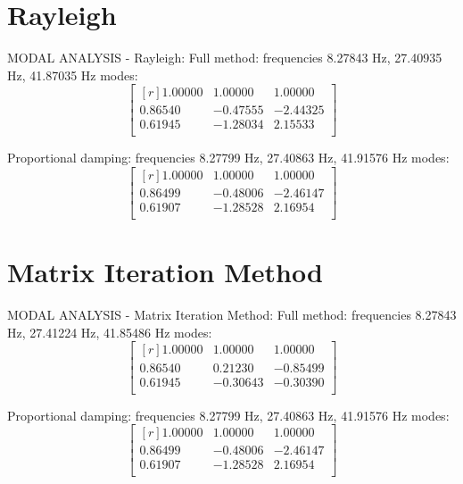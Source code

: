 \section{Rayleigh}
\label{sec:ray}
MODAL ANALYSIS - Rayleigh:
Full method:
 frequencies 8.27843 \si{\hertz}, 27.40935 \si{\hertz}, 41.87035 \si{\hertz}
 modes:
 \begin{equation}
\label{eq:raymodefree}
 \begin{bmatrix*}[r]
	1.00000 & 1.00000 & 1.00000 \\
	0.86540 &-0.47555 &-2.44325 \\
	0.61945 &-1.28034 & 2.15533 \\
 \end{bmatrix*}
\end{equation}

Proportional damping:
 frequencies 8.27799 \si{\hertz}, 27.40863 \si{\hertz}, 41.91576 \si{\hertz}
 modes:
 \begin{equation}
\label{eq:raymodeprop}
 \begin{bmatrix*}[r]
	1.00000 & 1.00000 & 1.00000 \\
	0.86499 &-0.48006 &-2.46147 \\
	0.61907 &-1.28528 & 2.16954 \\
	 \end{bmatrix*}
\end{equation}
%
\section{Matrix Iteration Method}
\label{sec:mim}
MODAL ANALYSIS - Matrix Iteration Method:
Full method:
 frequencies 8.27843 \si{\hertz}, 27.41224 \si{\hertz}, 41.85486 \si{\hertz}
 modes:
 \begin{equation}
\label{eq:mimmodefree}
 \begin{bmatrix*}[r]
	1.00000 & 1.00000 & 1.00000 \\
	0.86540 & 0.21230 &-0.85499 \\
	0.61945 &-0.30643 &-0.30390 \\
	 \end{bmatrix*}
\end{equation}

Proportional damping:
 frequencies 8.27799 \si{\hertz}, 27.40863 \si{\hertz}, 41.91576 \si{\hertz}
 modes:
 \begin{equation}
\label{eq:mimmodeprop}
 \begin{bmatrix*}[r]
	1.00000 & 1.00000 & 1.00000 \\
	0.86499 &-0.48006 &-2.46147 \\
	0.61907 &-1.28528 & 2.16954 \\
	 \end{bmatrix*}
\end{equation}
